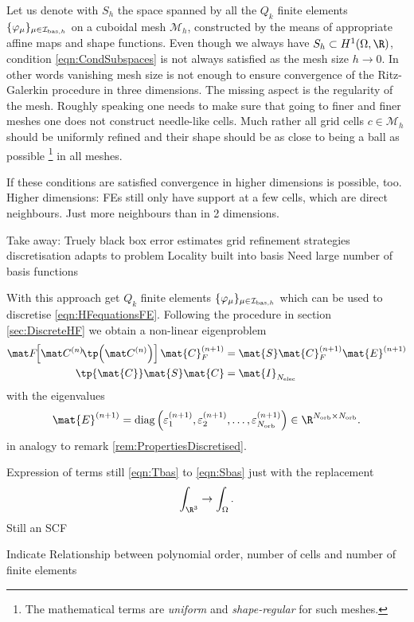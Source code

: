 Let us denote with $S_h$ the
space spanned by all the $Q_k$ finite elements $\{\varphi_\mu\}_{\mu\in\mathcal{I}_{\text{bas},h}}$
on a cuboidal mesh $\mathcal{M}_h$,
constructed by the means of appropriate affine maps and shape functions.
Even though we always have $S_h \subset H^1(\Omega, \R)$,
condition \eqref{eqn:CondSubspaces}
is not always satisfied as the mesh size $h \to 0$.
In other words vanishing mesh size is not enough
to ensure convergence of the Ritz-Galerkin procedure in three dimensions.
The missing aspect is the regularity of the mesh.
Roughly speaking one needs to make sure that going to finer and finer meshes
one does not construct needle-like cells.
Much rather all grid cells $c\in \mathcal{M}_h$ should
be uniformly refined and their shape should be as close to being
a ball as possible%
\footnote{The mathematical terms are \textit{uniform}
and \textit{shape-regular} for such meshes.}
in all meshes.

%
%

If these conditions are satisfied
convergence in higher dimensions is possible, too.
Higher dimensions: FEs still only have support at a  few cells,
which are direct neighbours.
Just more neighbours than in 2 dimensions.

Take away:
Truely black box
error estimates
grid refinement strategies
discretisation adapts to problem
Locality built into basis
Need large number of basis functions


With this approach get $Q_k$ finite elements $\{\varphi_\mu\}_{\mu\in\mathcal{I}_{\text{bas},h}}$
which can be used to discretise \eqref{eqn:HFequationsFE}.
Following the procedure in section \vref{sec:DiscreteHF}
we obtain a non-linear eigenproblem
\[
	\begin{aligned}
		\matFnfull \mat{C}_F^{(n+1)} &= \mat{S} \mat{C}_F^{(n+1)} \mat{E}^{(n+1)} \\
		\tp{\mat{C}} \mat{S} \mat{C} &= \mat{I}_{\Nelec}
	\end{aligned}
\]
with the eigenvalues
\[
	\mat{E}^{(n+1)}
	= \text{diag}\left(\varepsilon_1^{(n+1)},
	\varepsilon_2^{(n+1)}, \ldots,
	\varepsilon_{\Norb}^{(n+1)}\right) \in \R^{\Norb \times \Norb}.
\]
in analogy to remark \vref{rem:PropertiesDiscretised}.


Expression of terms still \eqref{eqn:Tbas} to \eqref{eqn:Sbas}
just with the replacement
\[ \int_{\R^3} \to \int_\Omega. \]
Still an SCF

Indicate Relationship between polynomial order, number of cells
and number of finite elements

